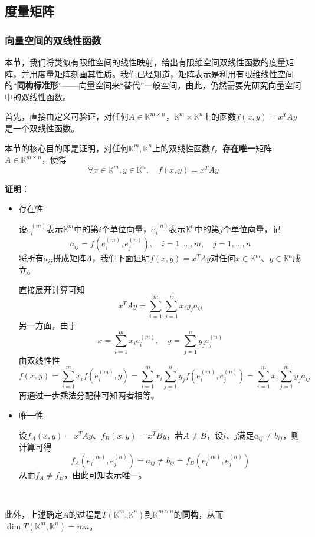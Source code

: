 \documentclass[a4paper,UTF8,fontset=windows,AutoFakeBold]{ctexart}
\newcommand{\proo}[1]{{\vspace{5pt}\kaishu\noindent\textbf{证明}：\vspace{-3pt}
\begin{compactitem}
    \item[] #1
\end{compactitem}
}}
\begin{document}
\subsection{度量矩阵}
\subsubsection{向量空间的双线性函数}
本节，我们将类似有限维空间的线性映射，给出有限维空间双线性函数的度量矩阵，并用度量矩阵刻画其性质。我们已经知道，矩阵表示是利用有限维线性空间的``\textbf{同构标准形}''——向量空间来``替代''一般空间，由此，仍然需要先研究向量空间中的双线性函数。

首先，直接由定义可验证，对任何$A\in\mathbb{K}^{m\times n}$，$\mathbb{K}^m\times\mathbb{K}^n$上的函数$f(x,y)=x^TAy$是一个双线性函数。

本节的核心目的即是证明，对任何$\mathbb{K}^m,\mathbb{K}^n$上的双线性函数$f$，\textbf{存在唯一}矩阵$A\in\mathbb{K}^{m\times n}$，使得
$$\forall x\in\mathbb{K}^m,y\in\mathbb{K}^n,\quad f(x,y)=x^TAy$$

\proo{
    \begin{itemize}
        \item 存在性
        
        设$e_i^{(m)}$表示$\mathbb{K}^m$中的第$i$个单位向量，$e_j^{(n)}$表示$\mathbb{K}^n$中的第$j$个单位向量，记
        $$a_{ij}=f(e_i^{(m)},e_j^{(n)}),\quad i=1,\dots,m,\quad j=1,\dots,n$$
        将所有$a_{ij}$拼成矩阵$A$，我们下面证明$f(x,y)=x^TAy$对任何$x\in\mathbb{K}^m$、$y\in\mathbb{K}^n$成立。

        直接展开计算可知
        $$x^TAy=\sum_{i=1}^m\sum_{j=1}^nx_iy_ja_{ij}$$
        另一方面，由于
        $$x=\sum_{i=1}^mx_ie_i^{(m)},\quad y=\sum_{j=1}^ny_je_j^{(n)}$$
        由双线性性
        $$f(x,y)=\sum_{i=1}^mx_if(e_i^{(m)},y)=\sum_{i=1}^mx_i\sum_{j=1}^ny_jf(e_i^{(m)},e_j^{(n)})=\sum_{i=1}^mx_i\sum_{j=1}^my_ja_{ij}$$
        再通过一步乘法分配律可知两者相等。

        \item 唯一性
        
        设$f_A(x,y)=x^TAy$、$f_B(x,y)=x^TBy$，若$A\ne B$，设$i$、$j$满足$a_{ij}\ne b_{ij}$，则计算可得
        $$f_A(e_i^{(m)},e_j^{(n)})=a_{ij}\ne b_{ij}=f_B(e_i^{(m)},e_j^{(n)})$$
        从而$f_A\ne f_B$，由此可知表示唯一。
    \end{itemize}
}

\

此外，上述确定$A$的过程是$T(\mathbb{K}^m,\mathbb{K}^n)$到$\mathbb{K}^{m\times n}$的\textbf{同构}，从而$\dim T(\mathbb{K}^m,\mathbb{K}^n)=mn$。
\end{document}
